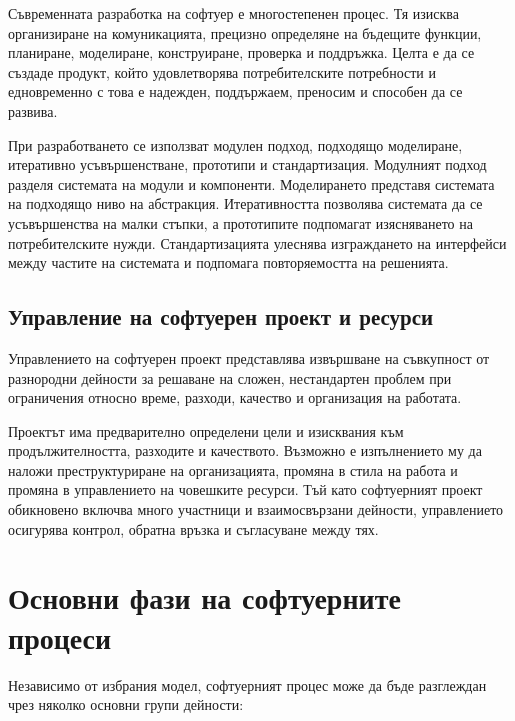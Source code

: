 Съвременната разработка на софтуер е многостепенен процес. Тя изисква организиране на комуникацията, прецизно определяне на бъдещите функции, планиране, моделиране, конструиране, проверка и поддръжка. Целта е да се създаде продукт, който удовлетворява потребителските потребности и едновременно с това е надежден, поддържаем, преносим и способен да се развива.

При разработването се използват модулен подход, подходящо моделиране, итеративно усъвършенстване, прототипи и стандартизация. Модулният подход разделя системата на модули и компоненти. Моделирането представя системата на подходящо ниво на абстракция. Итеративността позволява системата да се усъвършенства на малки стъпки, а прототипите подпомагат изясняването на потребителските нужди. Стандартизацията улеснява изграждането на интерфейси между частите на системата и подпомага повторяемостта на решенията.

\subsection{Управление на софтуерен проект и ресурси}\label{s:26.1.1}

\begin{defn}
Управлението на софтуерен проект представлява извършване на съвкупност от разнородни дейности за решаване на сложен, нестандартен проблем при ограничения относно време, разходи, качество и организация на работата.
\end{defn}

Проектът има предварително определени цели и изисквания към продължителността, разходите и качеството. Възможно е изпълнението му да наложи преструктуриране на организацията, промяна в стила на работа и промяна в управлението на човешките ресурси. Тъй като софтуерният проект обикновено включва много участници и взаимосвързани дейности, управлението осигурява контрол, обратна връзка и съгласуване между тях.

\section{Основни фази на софтуерните процеси}\label{s:26.2}

Независимо от избрания модел, софтуерният процес може да бъде разглеждан чрез няколко основни групи дейности:

